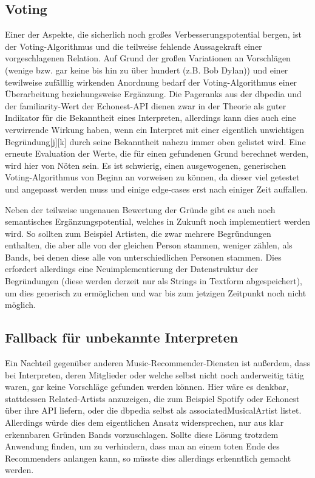 \subsection{Voting}
Einer der Aspekte, die sicherlich noch großes Verbesserungspotential bergen, ist der Voting-Algorithmus und die teilweise fehlende Aussagekraft einer vorgeschlagenen Relation. Auf Grund der großen Variationen an Vorschlägen (wenige bzw. gar keine bis hin zu über hundert (z.B. Bob Dylan)) und einer tewilweise zufälllig wirkenden Anordnung bedarf der Voting-Algorithmus einer Überarbeitung beziehungsweise Ergänzung. Die Pageranks aus der dbpedia und der familiarity-Wert der Echonest-API dienen zwar in der Theorie als guter Indikator für die Bekanntheit eines Interpreten, allerdings kann dies auch eine verwirrende Wirkung haben, wenn ein Interpret mit einer eigentlich unwichtigen Begründung[j][k] durch seine Bekanntheit nahezu immer oben gelistet wird. Eine erneute Evaluation der Werte, die für einen gefundenen Grund berechnet werden, wird hier von Nöten sein. Es ist schwierig, einen ausgewogenen, generischen Voting-Algorithmus von Beginn an vorweisen zu können, da dieser viel getestet und angepasst werden muss und einige edge-cases erst nach einiger Zeit auffallen.


Neben der teilweise ungenauen Bewertung der Gründe gibt es auch noch semantisches Ergänzungspotential, welches in Zukunft noch implementiert werden wird. So sollten zum Beispiel Artisten, die zwar mehrere Begründungen enthalten, die aber alle von der gleichen Person stammen, weniger zählen, als Bands, bei denen diese alle von unterschiedlichen Personen stammen. Dies erfordert allerdings eine Neuimplementierung der Datenstruktur der  Begründungen (diese werden derzeit nur als Strings in Textform abgespeichert), um dies generisch zu ermöglichen und war bis zum jetzigen Zeitpunkt noch nicht möglich.

\subsection{Fallback für unbekannte Interpreten}
Ein Nachteil gegenüber anderen Music-Recommender-Diensten ist außerdem, dass bei Interpreten, deren Mitglieder oder welche selbst nicht noch anderweitig tätig waren, gar keine Vorschläge gefunden werden können. Hier wäre es denkbar, stattdessen Related-Artists anzuzeigen, die zum Beispiel Spotify oder Echonest über ihre API liefern, oder die dbpedia selbst als associatedMusicalArtist listet. Allerdings würde dies dem eigentlichen Ansatz widersprechen, nur aus klar erkennbaren Gründen Bands vorzuschlagen. Sollte diese Lösung trotzdem Anwendung finden, um zu verhindern, dass man an einem toten Ende des Recommenders anlangen kann, so müsste dies allerdings erkenntlich gemacht werden.

